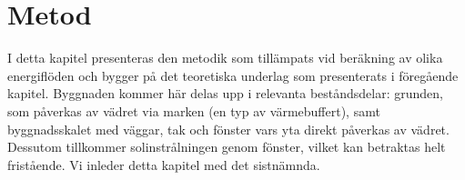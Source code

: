 \chapter{Metod}

I detta kapitel presenteras den metodik som tillämpats vid beräkning av olika energiflöden och bygger på det teoretiska underlag som presenterats i föregående kapitel. Byggnaden kommer här delas upp i relevanta beståndsdelar: grunden, som påverkas av vädret via marken (en typ av värmebuffert), samt byggnadsskalet med väggar, tak och fönster vars yta direkt påverkas av vädret. Dessutom tillkommer solinstrålningen genom fönster, vilket kan betraktas helt fristående. Vi inleder detta kapitel med det sistnämnda. 





